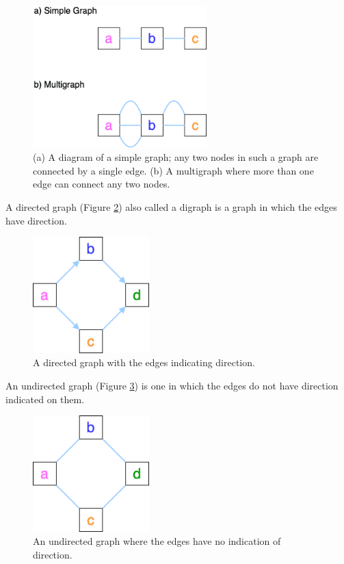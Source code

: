\documentclass[10pt, a4paper]{article}
\begin{document}
\begin{figure}[!ht]
\centering
\includegraphics[width=0.6\textwidth]{../Figures/Simple-and-Multigraph.png}
\caption[A simple graph and a multigraph]{\label{fig:org7d8874c}(a) A diagram of a simple graph; any two nodes in such a graph are connected by a single edge. (b) A multigraph where more than one edge can connect any two nodes.}
\end{figure}

A directed graph (Figure \ref{fig:org1f4ec0b}) also called a digraph is a graph in which the edges have
direction.

\begin{figure}[!ht]
\centering
\includegraphics[width=0.4\textwidth]{../Figures/Digraph.png}
\caption[A Directed Graph]{\label{fig:org1f4ec0b}A directed graph with the edges indicating direction.}
\end{figure}

An undirected graph (Figure \ref{fig:org8d6b2b8}) is one in which the edges do
not have direction indicated on them.

\begin{figure}[!ht]
\centering
\includegraphics[width=0.4\textwidth]{../Figures/Undirected.png}
\caption[An Undirected Graph]{\label{fig:org8d6b2b8}An undirected graph where the edges have no indication of direction.}
\end{figure}
\end{document}
